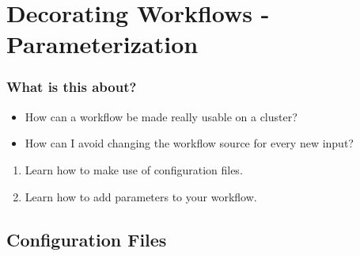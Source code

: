 \section{Decorating Workflows - Parameterization}
{   
}

\begin{frame}
  \frametitle{What is this about?}
   \begin{question}[Questions]
   	  \begin{itemize}
         \item How can a workflow be made really usable on a cluster?
         \item How can I avoid changing the workflow source for every new input?
      \end{itemize}
   \end{question}
   \begin{docs}[Objectives]
   	 \begin{enumerate}
                      \item Learn how to make use of configuration files.  
                      \item Learn how to add parameters to your workflow.
     \end{enumerate}
   \end{docs}
\end{frame}

\subsection{Configuration Files}


